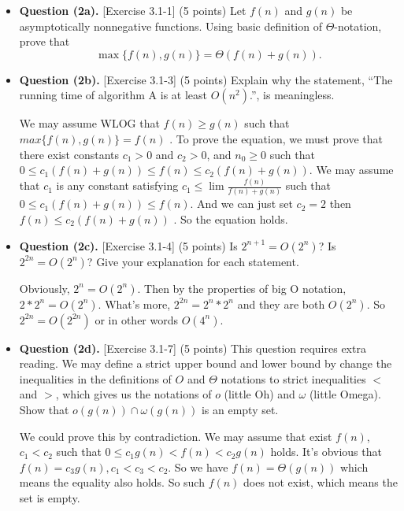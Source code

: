 \documentclass[11pt,letterpaper]{article}
\begin{document}
	\begin{itemize} 
		\item {\bf Question (2a).} [Exercise 3.1-1] (5 points) Let $f(n)$ and $g(n)$ be asymptotically nonnegative functions. Using basic definition of $\Theta$-notation, prove that 
		$$
		   \max\{f(n),g(n)\} = \Theta(f(n) + g(n)).
		$$
		\medskip
		
		\item {\bf Question (2b).} [Exercise 3.1-3] (5 points) Explain why the statement, ``The running time of algorithm A is at least $O(n^2)$.'', is
		meaningless.
		

        We may assume WLOG that $f(n) \geq g(n)$ such that $max\{f(n), g(n)\} = f(n)$ .
        To prove the equation, we must prove that there exist constants $c_1 > 0$ and $c_2 > 0$, and $n_0 \geq 0$ such that $0 \leq c_1 (f(n) + g(n)) \leq f(n) \leq c_2 (f(n) + g(n))$.
        We may assume that $c_1$ is any constant satisfying $c_1 \leq \lim \frac{f(n)}{f(n) + g(n)}$ such that $0 \leq c_1 (f(n) + g(n)) \leq f(n)$.
        And we can just set $c_2 = 2$ then $f(n) \leq c_2 (f(n) + g(n))$ .
        So the equation holds.
  
		\medskip
		
		\item {\bf Question (2c).} [Exercise 3.1-4] (5 points) Is $2^{n+1}=O(2^n)$? Is $2^{2n}=O(2^n)$? Give your explanation for each statement.
		

        Obviously, $2^n = O(2^n)$. Then by the properties of big O notation, $2 * 2^n = O(2^n)$.
        What's more, $2^{2n} = 2^n * 2^n$ and they are both $O(2^n)$. So $2^{2n} = O(2^{2n})$ or in other words $O(4^n)$.
  
		\medskip
		
		\item {\bf Question (2d).} [Exercise 3.1-7] (5 points) This question requires extra reading. We may define a strict upper bound and lower bound by change the inequalities in the definitions of $O$ and $\Theta$ notations to strict inequalities $<$ and $>$, which gives us the notations of $o$ (little Oh) and $\omega$ (little Omega). Show that $o(g(n))\cap \omega(g(n))$ is an empty set.
		

        We could prove this by contradiction. We may assume that exist $f(n)$, $c_1 < c_2$ such that $0 \leq c_1 g(n) < f(n) < c_2 g(n)$ holds. It's obvious that $f(n) = c_3 g(n), c_1 < c_3 < c_2$. So we have $f(n) = \Theta(g(n))$ which means the equality also holds. So such $f(n)$ does not exist, which means the set is empty.

		\medskip

	\end{itemize}
\end{document}
